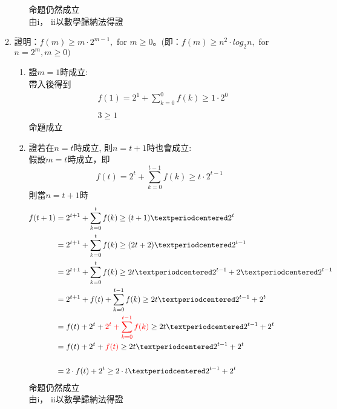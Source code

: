 \documentclass[a4paper, 12pt]{article}
\begin{document}
\begin{enumerate}
\begin{enumerate}
\begin{enumerate}
                              命題仍然成立\\
                              由i， ii以數學歸納法得證
                    \end{enumerate}
                \newpage
                \item 證明：$f(m)\geq m·2^{m−1},$ for $ m\geq 0。($即：$f(m)\geq n^2·log_{2} n, $ for $ n= 2^m, m\geq 0)$
                    \begin{enumerate}
                        \item 證$m = 1$時成立:\\
                              帶入後得到
                              \begin{align*}
                                &f(1)=2^1+\sum_{k=0}^{0} f(k)\geq 1 \cdot 2^0 \\\\
                                &3\geq 1 
                              \end{align*}
                              命題成立
                        \item 證若在$n=t$時成立, 則$n=t+1$時也會成立:\\
                              假設$m=t$時成立，即$$f(t)=2^{t}+\sum_{k=0}^{t-1} f(k)\geq t·2^{t−1}$$
                              則當$n=t+1$時
                              \begin{align*}
                                f(t+1) &= 2^{t+1}+\sum_{k=0}^{t} f(k)\geq (t+1)·2^{t}\\
                                       &= 2^{t+1}+\sum_{k=0}^{t} f(k)\geq (2t+2)·2^{t-1}\\
                                       &= 2^{t+1}+\sum_{k=0}^{t} f(k)\geq 2t·2^{t-1}+2·2^{t-1}\\
                                       &= 2^{t+1}+f(t)+\sum_{k=0}^{t-1} f(k)\geq 2t·2^{t-1}+2^{t}\\
                                       &= f(t)+2^{t}+{\color{red}2^{t}+\sum_{k=0}^{t-1} f(k)}\geq 2t·2^{t-1}+2^{t}\\
                                       &= f(t)+2^{t}+{\color{red}f(t)}\geq 2t·2^{t-1}+2^{t}\\\\
                                       &= 2\cdot f(t)+2^{t}\geq 2\cdot t·2^{t-1}+2^{t}
                              \end{align*}
                              命題仍然成立\\
                              由i， ii以數學歸納法得證
                \newpage


\end{enumerate}
\end{enumerate}
\end{enumerate}
\end{document}
